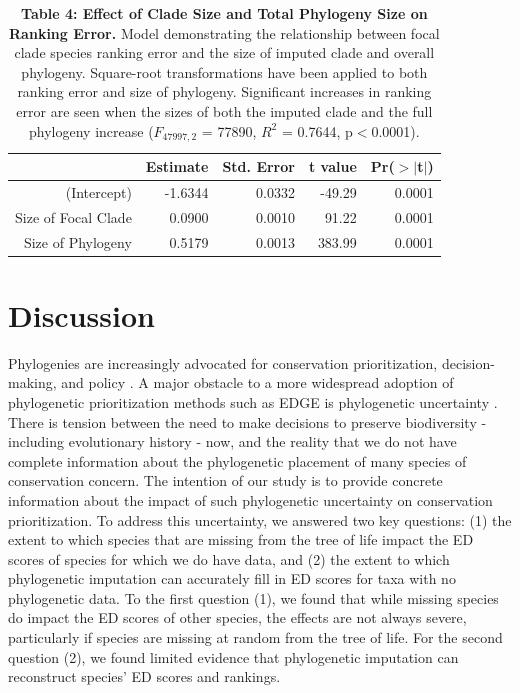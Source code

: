 \documentclass[12pt,english]{article}
\begin{document}
\begin{table}[ht]
  \centering
  \begin{tabular}{rrrrr}
    \hline
   & Estimate & Std. Error & t value & Pr($>$$|$t$|$) \\
    \hline
  (Intercept) & -1.6344 & 0.0332 & -49.29 & 0.0001 \\
    Size of Focal Clade & 0.0900 & 0.0010 & 91.22 & 0.0001 \\
    Size of Phylogeny & 0.5179 & 0.0013 & 383.99 & 0.0001 \\
     \hline
     \hline
  \end{tabular}
  \caption*{\textbf{Table 4: Effect of Clade Size and Total Phylogeny Size on
  Ranking Error.} Model demonstrating the relationship between focal clade
  species ranking error and the size of imputed clade and overall phylogeny.
  Square-root transformations have been applied to both ranking error and size
  of phylogeny. Significant increases in ranking error are seen when the sizes
  of both the imputed clade and the full phylogeny increase ($F_{47997, 2}$ =
  77890, $R^{2}$ = 0.7644, p$<$0.0001).}
  \end{table}

\clearpage
\section*{Discussion}
Phylogenies are increasingly advocated for conservation prioritization,
decision-making, and policy \autocite{Vezquez1998}. A major obstacle to a more
widespread adoption of phylogenetic prioritization methods such as EDGE is
phylogenetic uncertainty \autocite{Collen2015}. There is tension between the
need to make decisions to preserve biodiversity - including evolutionary history
- now, and the reality that we do not have complete information about the
phylogenetic placement of many species of conservation concern. The intention of
our study is to provide concrete information about the impact of such
phylogenetic uncertainty on conservation prioritization. To address this
uncertainty, we answered two key questions: (1) the extent to which species that
are missing from the tree of life impact the ED scores of species for which we
do have data, and (2) the extent to which phylogenetic imputation can accurately
fill in ED scores for taxa with no phylogenetic data. To the first question (1),
we found that while missing species do impact the ED scores of other species,
the effects are not always severe, particularly if species are missing at random
from the tree of life. For the second question (2), we found limited evidence
that phylogenetic imputation can reconstruct species’ ED scores and rankings.
\end{document}
